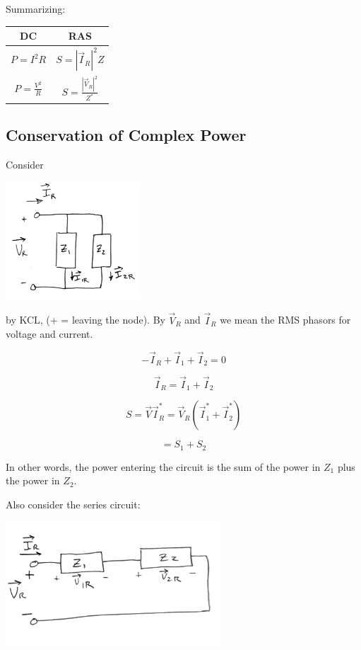 Summarizing:

\begin{center}
\begin{tabular}{c|c}
DC & RAS \\
\hline
$P = I^2 R$ & $S = |\vec{I}_R|^2 Z$ \\
$P = \frac{V^2}{R}$ & $S = \frac{|\vec{V}_R|^2}{Z^*}$ \\
\end{tabular}
\end{center}





\subsection{Conservation of Complex Power}

\noindent Consider

\includegraphics[width=50mm]{figsChapt03/QM27615.png}

by KCL, (+ = leaving the node).   By $\vec V_R$ and $\vec I_R$ we mean
the RMS phasors for voltage and current.

\[
-\vec{I}_R + \vec{I}_{1} + \vec{I}_{2} = 0
\]


\[
\vec{I}_R = \vec{I}_{1} + \vec{I}_{2}
\]

\[
S = \vec{V} \vec{I}_R^* = \vec{V}_R (\vec{I}_{1}^* + \vec{I}_{2}^*)
\]

\[
= S_1 + S_2
\]

In other words, the power entering the circuit is the sum of the power in
$Z_1$ plus the power in $Z_2$.



\noindent Also consider the series circuit:

\includegraphics[width=80mm]{figsChapt03/RQ15238.png}


